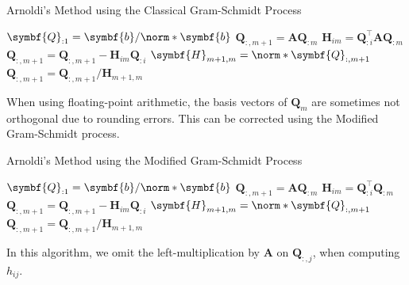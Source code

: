 \documentclass{article}
\begin{document}
\begin{algorithm}[H]
    \caption{Arnoldi's Method using the Classical Gram-Schmidt Process}
    \begin{algorithmic}
        \State \(\symbf{Q}_{:1} = \symbf{b}/\norm*{\symbf{b}}\)
        \State \(\symbf{Q}_{:,m+1} = \symbf{A} \symbf{Q}_{:m}\)
        \State \(\symbf{H}_{im} = \symbf{Q}_{:i}^\top \symbf{A} \symbf{Q}_{:m}\) 
        \State \(\symbf{Q}_{:,m+1} = \symbf{Q}_{:,m+1} - \symbf{H}_{im} \symbf{Q}_{:i}\)
        \EndFor
        \State \(\symbf{H}_{m+1,m} = \norm*{\symbf{Q}_{:,m+1}}\) 
        \Statex
        \State \(\symbf{Q}_{:,m+1} = \symbf{Q}_{:,m+1} / \symbf{H}_{m+1,m}\) 
        \EndIf
        \EndFor
    \end{algorithmic}
\end{algorithm}
When using floating-point arithmetic, the basis vectors of \(\symbf{Q}_m\)
are sometimes not orthogonal due to rounding errors. This can be corrected
using the Modified Gram-Schmidt process.
\begin{algorithm}[H]
    \caption{Arnoldi's Method using the Modified Gram-Schmidt Process}
    \begin{algorithmic}
        \State \(\symbf{Q}_{:1} = \symbf{b}/\norm*{\symbf{b}}\)
        \State \(\symbf{Q}_{:,m+1} = \symbf{A} \symbf{Q}_{:m}\)
        \State \(\symbf{H}_{im} = \symbf{Q}_{:i}^\top \symbf{Q}_{:m}\) 
        \State \(\symbf{Q}_{:,m+1} = \symbf{Q}_{:,m+1} - \symbf{H}_{im} \symbf{Q}_{:i}\)
        \EndFor
        \State \(\symbf{H}_{m+1,m} = \norm*{\symbf{Q}_{:,m+1}}\) 
        \Statex
        \State \(\symbf{Q}_{:,m+1} = \symbf{Q}_{:,m+1} / \symbf{H}_{m+1,m}\) 
        \EndIf
        \EndFor
    \end{algorithmic}
\end{algorithm}
In this algorithm, we omit the left-multiplication by \(\symbf{A}\) on
\(\symbf{Q}_{:,j}\), when computing \(h_{ij}\).
\end{document}
